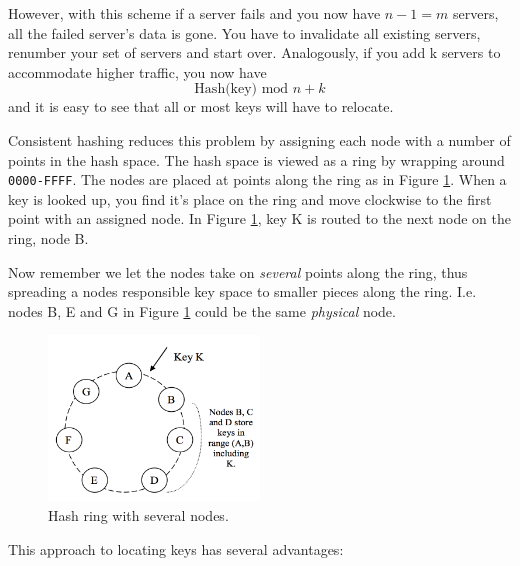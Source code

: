 However, with this scheme if a server fails and you now have $n-1=m$ servers, all the failed server's data is gone.
You have to invalidate all existing servers, renumber your set of servers and start over.
Analogously, if you add k servers to accommodate higher traffic, you now have $$\textrm{Hash(key) mod } n + k$$ and it is easy to see that all or most keys will have to relocate.

Consistent hashing reduces this problem by assigning each node with a number of points in the hash space.
The hash space is viewed as a ring by wrapping around \texttt{0000-FFFF}. The nodes are placed at points along the ring as in Figure \ref{fig:hashring}. When a key is looked up, you find it's place on the ring and move clockwise to the first point with an assigned node. In Figure \ref{fig:hashring}, key K is routed to the next node on the ring, node B.

Now remember we let the nodes take on \emph{several} points along the ring, thus spreading a nodes responsible key space to smaller pieces along the ring.
I.e. nodes B, E and G in Figure \ref{fig:hashring} could be the same \emph{physical} node.

\begin{figure}[h]
    \centering
    \includegraphics[width=0.5\textwidth]{introduction/hashring}
    \caption{Hash ring with several nodes\cite{dynamo}.}
    \label{fig:hashring}
\end{figure}

This approach to locating keys has several advantages:

